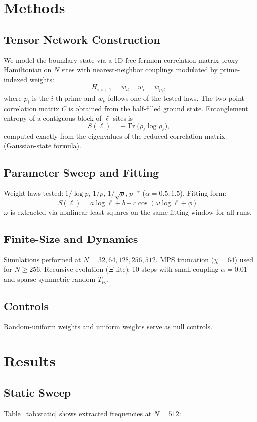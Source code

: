 \documentclass[11pt, a4paper]{article}
\begin{document}
\section{Methods}
\subsection{Tensor Network Construction}
We model the boundary state via a 1D free-fermion correlation-matrix proxy Hamiltonian on \(N\) sites with nearest-neighbor couplings modulated by prime-indexed weights:
\[
H_{i,i+1} = w_i, \quad w_i = w_{p_i},
\]
where \(p_i\) is the \(i\)-th prime and \(w_p\) follows one of the tested laws. The two-point correlation matrix \(C\) is obtained from the half-filled ground state. Entanglement entropy of a contiguous block of \(\ell\) sites is
\[
S(\ell) = -\operatorname{Tr}\bigl(\rho_\ell \log \rho_\ell\bigr),
\]
computed exactly from the eigenvalues of the reduced correlation matrix (Gaussian-state formula).

\subsection{Parameter Sweep and Fitting}
Weight laws tested: \(1/\log p\), \(1/p\), \(1/\sqrt{p}\), \(p^{-\alpha}\) (\(\alpha=0.5,1.5\)).  
Fitting form:
\[
S(\ell) = a \log \ell + b + c \cos(\omega \log \ell + \phi).
\]
\(\omega\) is extracted via nonlinear least-squares on the same fitting window for all runs.

\subsection{Finite-Size and Dynamics}
Simulations performed at \(N=32,64,128,256,512\). MPS truncation (\(\chi=64\)) used for \(N\ge256\).  
Recursive evolution (\(\Xi\)-lite): 10 steps with small coupling \(\alpha=0.01\) and sparse symmetric random \(T_{pq}\).

\subsection{Controls}
Random-uniform weights and uniform weights serve as null controls.

\section{Results}
\subsection{Static Sweep}
Table~\ref{tab:static} shows extracted frequencies at \(N=512\):
\end{document}
